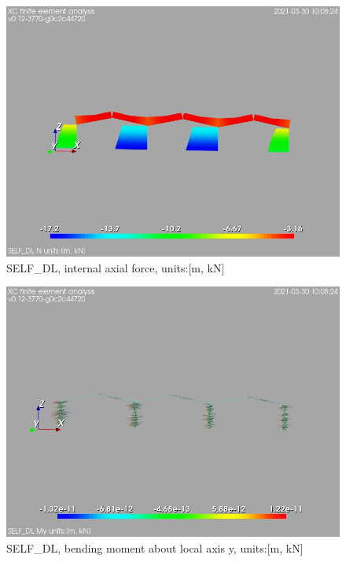 \begin{figure}
\begin{center}
\includegraphics[width=\linewidth]{calc_results/sole_zeinali/text/graphics/resSimplLC/SELF_DLallMemberSetN}
\caption{SELF_DL, internal axial force, units:[m, kN]}
\end{center}
\end{figure}
\begin{figure}
\begin{center}
\includegraphics[width=\linewidth]{calc_results/sole_zeinali/text/graphics/resSimplLC/SELF_DLallMemberSetMy}
\caption{SELF_DL, bending moment about local axis y, units:[m, kN]}
\end{center}
\end{figure}
